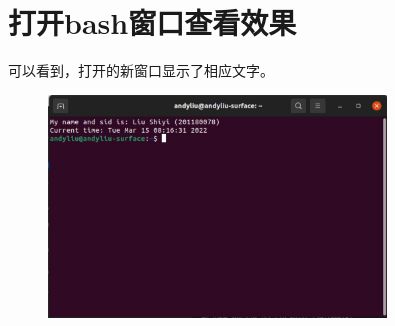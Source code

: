 \documentclass[UTF8]{ctexart}
\begin{document}
    \section{打开bash窗口查看效果}
    可以看到，打开的新窗口显示了相应文字。
    \begin{figure}[H]
        \centering
        \includegraphics[width=0.8\textwidth]{assets/3.jpg}
    \end{figure}
\end{document}

